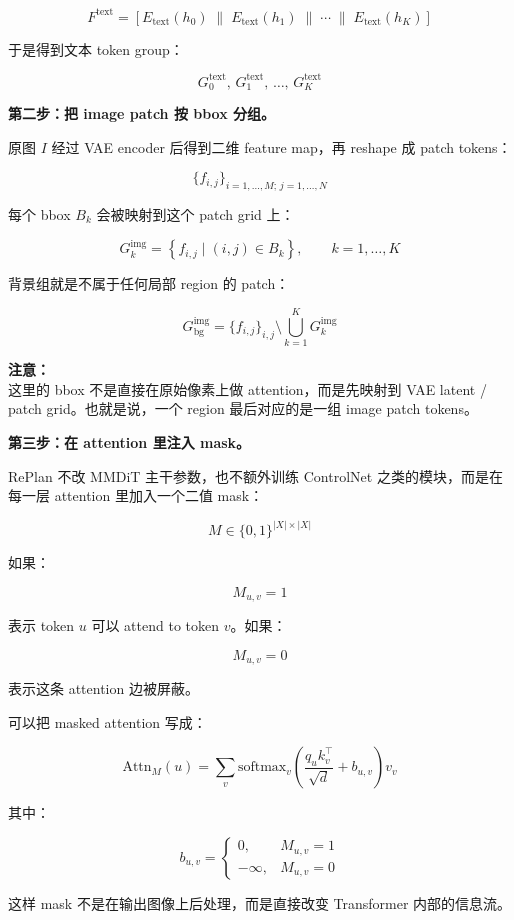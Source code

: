 \[
F^\text{text}
=
\left[
E_\text{text}(h_0)
\;\|\;
E_\text{text}(h_1)
\;\|\;
\cdots
\;\|\;
E_\text{text}(h_K)
\right]
\]

于是得到文本 token group：

\[
G^\text{text}_0,\,
G^\text{text}_1,\,
\ldots,\,
G^\text{text}_K
\]

\textbf{第二步：把 image patch 按 bbox 分组。}

原图 $I$ 经过 VAE encoder 后得到二维 feature map，再 reshape 成 patch tokens：

\[
\{f_{i,j}\}_{i=1,\ldots,M;\,j=1,\ldots,N}
\]

每个 bbox $B_k$ 会被映射到这个 patch grid 上：

\[
G^\text{img}_k
=
\left\{
f_{i,j}
\mid
(i,j)\in B_k
\right\},
\qquad
k=1,\ldots,K
\]

背景组就是不属于任何局部 region 的 patch：

\[
G^\text{img}_\text{bg}
=
\{f_{i,j}\}_{i,j}
\setminus
\bigcup_{k=1}^{K}
G^\text{img}_k
\]

\begin{warnbox}
\textbf{注意：}\\
这里的 bbox 不是直接在原始像素上做 attention，而是先映射到 VAE latent / patch grid。也就是说，一个 region 最后对应的是一组 image patch tokens。
\end{warnbox}

\textbf{第三步：在 attention 里注入 mask。}

RePlan 不改 MMDiT 主干参数，也不额外训练 ControlNet 之类的模块，而是在每一层 attention 里加入一个二值 mask：

\[
M
\in
\{0,1\}^{|X|\times |X|}
\]

如果：

\[
M_{u,v}=1
\]

表示 token $u$ 可以 attend to token $v$。如果：

\[
M_{u,v}=0
\]

表示这条 attention 边被屏蔽。

可以把 masked attention 写成：

\[
\text{Attn}_M(u)
=
\sum_v
\text{softmax}_v
\left(
\frac{q_u k_v^\top}{\sqrt{d}}
+
b_{u,v}
\right)
v_v
\]

其中：

\[
b_{u,v}
=
\begin{cases}
0, & M_{u,v}=1 \\
-\infty, & M_{u,v}=0
\end{cases}
\]

这样 mask 不是在输出图像上后处理，而是直接改变 Transformer 内部的信息流。

